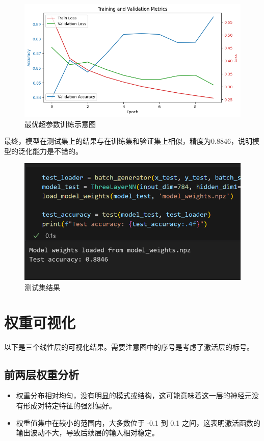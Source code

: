 \documentclass[a4paper,12pt]{article}
\begin{document}
\begin{figure}[H]
    \centering
    \includegraphics[width=1\textwidth]{train_graph.png}
    \caption{最优超参数训练示意图}
    \label{fig:example}
\end{figure}

最终，模型在测试集上的结果与在训练集和验证集上相似，精度为0.8846，说明模型的泛化能力是不错的。

\begin{figure}[H]
    \centering
    \includegraphics[width=1\textwidth]{test.png}
    \caption{测试集结果}
    \label{fig:example}
\end{figure}

\section{权重可视化}
以下是三个线性层的可视化结果。需要注意图中的序号是考虑了激活层的标号。

\subsection{前两层权重分析}
\begin{itemize}
    \item 权重分布相对均匀，没有明显的模式或结构，这可能意味着这一层的神经元没有形成对特定特征的强烈偏好。
    \item 权重值集中在较小的范围内，大多数位于 -0.1 到 0.1 之间，这表明激活函数的输出波动不大，导致后续层的输入相对稳定。
\end{itemize}
\end{document}
